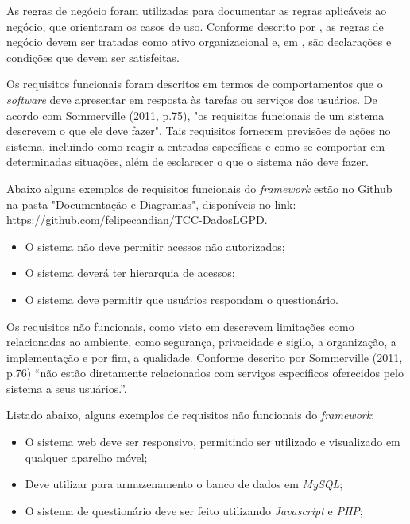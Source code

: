 \documentclass[
	12pt,				%
	openright,			%
	oneside,			%
	a4paper,			%
	english,			%
	french,				%
	spanish,			%
	brazil,				%
	]{abntex2}
\begin{document}
As regras de negócio foram utilizadas para documentar as regras aplicáveis ao negócio, que orientaram os casos de uso. Conforme descrito por , as regras de negócio devem ser tratadas como ativo organizacional e, em \cite{Wazlawick2013}, são declarações e condições que devem ser satisfeitas.

Os requisitos funcionais foram descritos em termos de comportamentos que o \textit{software} deve apresentar em resposta às tarefas ou serviços dos usuários. De acordo com Sommerville (2011, p.75), "os requisitos funcionais de um sistema descrevem o que ele deve fazer". Tais requisitos fornecem previsões de ações no sistema, incluindo como reagir a entradas específicas e como se comportar em determinadas situações, além de esclarecer o que o sistema não deve fazer.


Abaixo alguns exemplos de requisitos funcionais do \textit{framework} estão no Github na pasta "Documentação e Diagramas", disponíveis no link: \url{https://github.com/felipecandian/TCC-DadosLGPD}.
\begin{itemize}
\item O sistema não deve permitir acessos não autorizados;
\item O sistema deverá ter hierarquia de acessos;
\item O sistema deve permitir que usuários respondam o questionário.
\end{itemize}

Os requisitos não funcionais, como visto em  descrevem limitações como relacionadas ao ambiente, como segurança, privacidade e sigilo, a organização, a implementação e por fim, a qualidade. Conforme descrito por Sommerville (2011, p.76) “não estão diretamente relacionados com serviços específicos oferecidos pelo sistema a seus usuários.”. 

Listado abaixo, alguns exemplos de requisitos não funcionais do \textit{framework}:

\begin{itemize}
\item O sistema web deve ser responsivo, permitindo ser utilizado e visualizado em qualquer aparelho móvel;
\item Deve utilizar para armazenamento o banco de dados em \textit{MySQL};
\item O sistema de questionário deve ser feito utilizando \textit{Javascript} e \textit{PHP};
\end{itemize}
\end{document}
